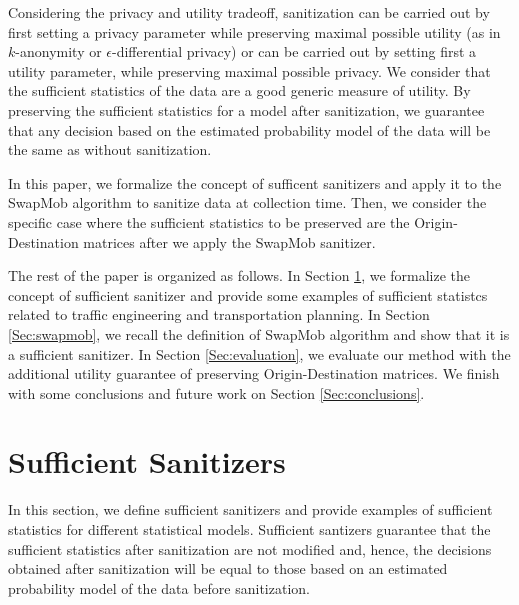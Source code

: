 \documentclass[times,twocolumn,final,authoryear]{elsarticle}
\begin{document}
Considering the privacy and utility tradeoff, sanitization can be carried out by first setting a privacy parameter while preserving maximal possible utility (as in $k$-anonymity or $\epsilon$-differential privacy) or can be carried out by setting first a utility parameter, while preserving maximal possible privacy.
We consider that the sufficient statistics of the data are a good generic measure of utility. 
By preserving the sufficient statistics for a model after sanitization, we guarantee that any decision based on the estimated probability model of the data will be the same as without sanitization.

In this paper, we formalize the concept of sufficent sanitizers and apply it to the SwapMob algorithm to sanitize data at collection time. 
Then, we consider the specific case where the sufficient statistics to be preserved are the Origin-Destination matrices after we apply the SwapMob sanitizer.

  
The rest of the paper is organized as follows. In Section \ref{Sec:SufficientSanitizer}, we formalize the concept of sufficient sanitizer and provide some examples of sufficient statistcs related to traffic engineering and transportation planning. 
In Section \ref{Sec:swapmob}, 
we recall the definition of SwapMob algorithm and show that it is a sufficient sanitizer.
In Section \ref{Sec:evaluation}, we evaluate our method  with the additional utility guarantee of preserving Origin-Destination matrices. 
We finish with some conclusions and future work on Section \ref{Sec:conclusions}.


\section{Sufficient Sanitizers}\label{Sec:SufficientSanitizer}
In this section, we define sufficient sanitizers and provide examples of sufficient statistics for different statistical models.
Sufficient santizers guarantee that the sufficient statistics after sanitization are not modified and, hence, the decisions obtained after sanitization will be equal to those based on an estimated probability model of the data before sanitization.
\end{document}
